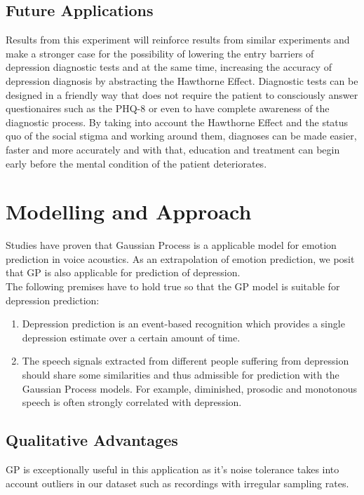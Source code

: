 \documentclass{article}
\begin{document}
	\subsection{Future Applications}
	Results from this experiment will reinforce results from similar experiments and make a stronger case for the possibility of lowering the entry barriers of depression diagnostic tests and at the same time, increasing the accuracy of depression diagnosis by abstracting the Hawthorne Effect. 
	Diagnostic tests can be designed in a friendly way that does not require the patient to consciously answer questionaires such as the PHQ-8 or even to have complete awareness of the diagnostic process. 
	By taking into account the Hawthorne Effect and the status quo of the social stigma and working around them, diagnoses can be made easier, faster and more accurately and with that, education and treatment can begin early before the mental condition of the patient deteriorates.
	
	\section{Modelling and Approach}
	Studies have proven that Gaussian Process is a applicable model for emotion prediction in voice acoustics. As an extrapolation of emotion prediction, we posit that GP is also applicable for prediction of depression. \\	
	
	The following premises have to hold true so that the GP model is suitable for depression prediction:
	\begin{enumerate}
		\item Depression prediction is an event-based recognition which provides a single depression estimate over a certain amount of time. \cite{Valstar2016}
		\item The speech signals extracted from different people suffering from depression should share some similarities and thus admissible for prediction with the Gaussian Process models. 
		For example, diminished, prosodic and monotonous speech is often strongly correlated with depression.\cite{Cummins2015}
	\end{enumerate}

	\subsection{Qualitative Advantages}
	GP is exceptionally useful in this application as it's noise tolerance takes into account outliers in our dataset such as recordings with irregular sampling rates. \\
\end{document}
